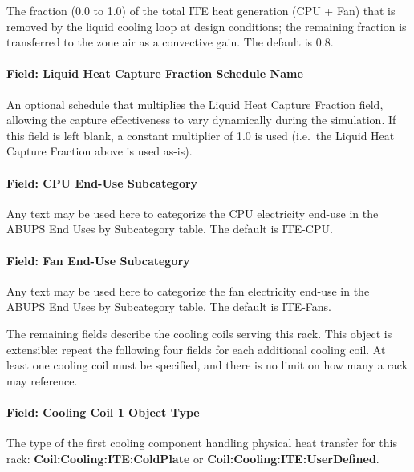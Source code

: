 The fraction (0.0 to 1.0) of the total ITE heat generation (CPU + Fan) that is removed by the liquid cooling loop at design conditions; the remaining fraction is transferred to the zone air as a convective gain. The default is 0.8.

\paragraph{Field: Liquid Heat Capture Fraction Schedule Name}\label{field-liquid-heat-capture-fraction-schedule-name-iteliquidcooled}

An optional schedule that multiplies the Liquid Heat Capture Fraction field, allowing the capture effectiveness to vary dynamically during the simulation. If this field is left blank, a constant multiplier of 1.0 is used (i.e.\ the Liquid Heat Capture Fraction above is used as-is).

\paragraph{Field: CPU End-Use Subcategory}\label{field-cpu-end-use-subcategory-iteliquidcooled}

Any text may be used here to categorize the CPU electricity end-use in the ABUPS End Uses by Subcategory table. The default is ITE-CPU.

\paragraph{Field: Fan End-Use Subcategory}\label{field-fan-end-use-subcategory-iteliquidcooled}

Any text may be used here to categorize the fan electricity end-use in the ABUPS End Uses by Subcategory table. The default is ITE-Fans.

The remaining fields describe the cooling coils serving this rack. This object is extensible: repeat the following four fields for each additional cooling coil. At least one cooling coil must be specified, and there is no limit on how many a rack may reference.

\paragraph{Field: Cooling Coil 1 Object Type}\label{field-cooling-coil-1-object-type-iteliquidcooled}

The type of the first cooling component handling physical heat transfer for this rack: \textbf{Coil:Cooling:ITE:ColdPlate} or \textbf{Coil:Cooling:ITE:UserDefined}.

